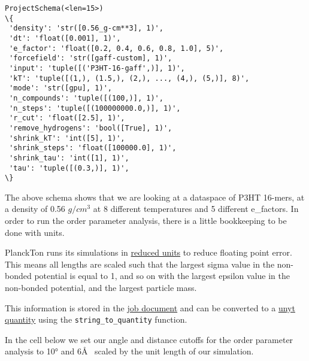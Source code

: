             \begin{tcolorbox}[breakable, size=fbox, boxrule=.5pt, pad at break*=1mm, opacityfill=0]
\begin{Verbatim}[commandchars=\\\{\}]
ProjectSchema(<len=15>)
\{
 'density': 'str([0.56_g-cm**3], 1)',
 'dt': 'float([0.001], 1)',
 'e_factor': 'float([0.2, 0.4, 0.6, 0.8, 1.0], 5)',
 'forcefield': 'str([gaff-custom], 1)',
 'input': 'tuple([('P3HT-16-gaff',)], 1)',
 'kT': 'tuple([(1,), (1.5,), (2,), ..., (4,), (5,)], 8)',
 'mode': 'str([gpu], 1)',
 'n_compounds': 'tuple([(100,)], 1)',
 'n_steps': 'tuple([(100000000.0,)], 1)',
 'r_cut': 'float([2.5], 1)',
 'remove_hydrogens': 'bool([True], 1)',
 'shrink_kT': 'int([5], 1)',
 'shrink_steps': 'float([100000.0], 1)',
 'shrink_tau': 'int([1], 1)',
 'tau': 'tuple([(0.3,)], 1)',
\}
\end{Verbatim}
\end{tcolorbox}
        
    The above schema shows that we are looking at a dataspace of P3HT
16-mers, at a density of 0.56 \(g/cm^{3}\) at 8 different temperatures
and 5 different e\_factors. In order to run the order parameter
analysis, there is a little bookkeeping to be done with units.

PlanckTon runs its simulations in
\href{https://hoomd-blue.readthedocs.io/en/latest/units.html}{reduced
units} to reduce floating point error. This means all lengths are scaled
such that the largest sigma value in the non-bonded potential is equal
to 1, and so on with the largest epsilon value in the non-bonded
potential, and the largest particle mass.

This information is stored in the
\href{https://docs.signac.io/en/latest/jobs.html\#the-job-document}{job
document} and can be converted to a
\href{https://unyt.readthedocs.io/en/stable/}{unyt quantity} using the
\texttt{string\_to\_quantity} function.

In the cell below we set our angle and distance cutoffs for the order
parameter analysis to 10° and 6\AA~ scaled by the unit length of our
simulation.

